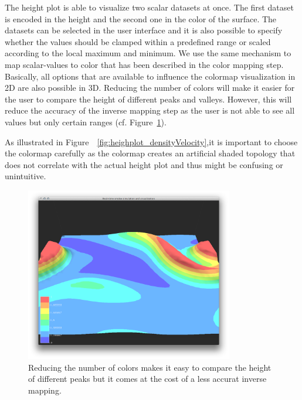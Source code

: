 The height plot is able to visualize two scalar datasets at once. The first dataset is encoded in the height and the second one in the color of the surface. The datasets can be selected in the user interface and it is also possible to specify whether the values should be clamped within a predefined range or scaled according to the local maximum and minimum. 
We use the same mechanism to map scalar-values to color that has been described in the color mapping step. Basically, all options that are available to influence the colormap visualization in 2D are also possible in 3D. Reducing the number of colors will make it easier for the user to compare the height of different peaks and valleys. However, this will reduce the accuracy of the inverse mapping step as the user is not able to see all values but only certain ranges (cf. Figure~\ref{fig:figures_heightplot_densitydensitybanding}).


As illustrated in Figure~~\ref{fig:heighplot_densityVelocity},it is important to choose the colormap carefully as the colormap creates an artificial shaded topology that does not correlate with the actual height plot and thus might be confusing or unintuitive.

\begin{figure}[htbp]
    \centering \includegraphics[height=3in]{figures/heightplot/densitydensitybanding.png}
    \caption{Reducing the number of colors makes it easy to compare the height of different peaks but it comes at the cost of a less accurat inverse mapping.}
    \label{fig:figures_heightplot_densitydensitybanding}
\end{figure}



